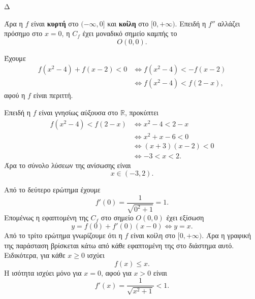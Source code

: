 \begin{thema}{Δ}
\begin{erwthma}
Άρα η $f$ είναι \textbf{κυρτή} στο $(-\infty,0]$ και \textbf{κοίλη} στο $[0,+\infty)$. Επειδή η $f''$ αλλάζει πρόσημο στο $x=0$, η $C_f$ έχει μοναδικό σημείο καμπής το
\[
{O(0,0)}.
\]

\item Έχουμε
\begin{align*}
f(x^2-4)+f(x-2)<0
&\Leftrightarrow f(x^2-4)<-f(x-2)\\
&\Leftrightarrow f(x^2-4)<f(2-x),
\end{align*}
αφού η $f$ είναι περιττή.

Επειδή η $f$ είναι γνησίως αύξουσα στο $\mathbb{R}$, προκύπτει
\begin{align*}
f(x^2-4)<f(2-x)
&\Leftrightarrow x^2-4<2-x\\
&\Leftrightarrow x^2+x-6<0\\
&\Leftrightarrow (x+3)(x-2)<0\\
&\Leftrightarrow -3<x<2.
\end{align*}
Άρα το σύνολο λύσεων της ανίσωσης είναι
\[
{x\in(-3,2)}.
\]

\item Από το δεύτερο ερώτημα έχουμε
\[
f'(0)=\frac{1}{\sqrt{0^2+1}}=1.
\]
Επομένως η εφαπτομένη της $C_f$ στο σημείο $O(0,0)$ έχει εξίσωση
\[
y=f(0)+f'(0)(x-0)\Leftrightarrow y=x.
\]
Από το τρίτο ερώτημα γνωρίζουμε ότι η $f$ είναι κοίλη στο $[0,+\infty)$. Άρα η γραφική της παράσταση βρίσκεται κάτω από κάθε εφαπτομένη της στο διάστημα αυτό. Ειδικότερα, για κάθε $x\geq0$ ισχύει
\[
{f(x)\leq x}.
\]
Η ισότητα ισχύει μόνο για $x=0$, αφού για $x>0$ είναι
\[
f'(x)=\frac{1}{\sqrt{x^2+1}}<1.
\]
\end{erwthma}
\end{thema}

